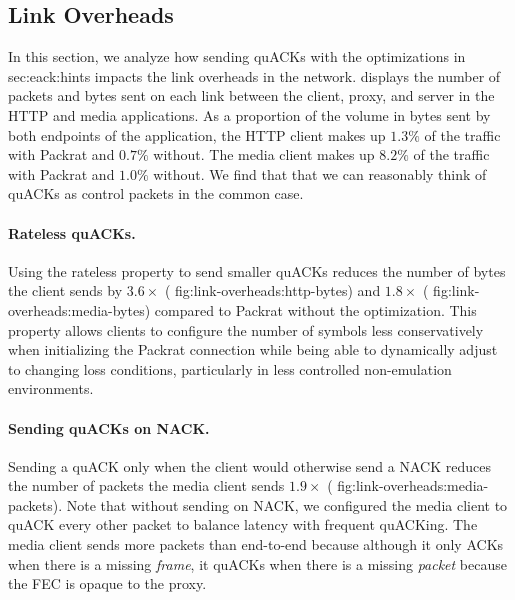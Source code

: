 \subsection{Link Overheads}


In this section, we analyze how sending quACKs with the optimizations in \Cref
{sec:eack:hints} impacts the link overheads in the network.
 displays the number of packets and bytes sent on each
link between the client, proxy, and server in the HTTP and media applications.
As a proportion of the volume in bytes sent by both endpoints of the
application, the HTTP client makes up $1.3\%$ of the traffic with Packrat and
$0.7\%$ without. The media client makes up $8.2\%$ of the traffic with Packrat
and $1.0\%$ without. We find that that we can reasonably think of quACKs as
control packets in the common case.

\paragraph{Rateless quACKs.}
Using the rateless property to send smaller quACKs
reduces the number of bytes the client sends by $3.6\!\times$ (\Cref
{fig:link-overheads:http-bytes}) and $1.8\!\times$ (\Cref
{fig:link-overheads:media-bytes}) compared to Packrat without the optimization.
This property allows clients to configure the number of symbols less
conservatively when initializing the Packrat connection while being able to
dynamically adjust to changing loss conditions, particularly in less controlled
non-emulation environments.

\paragraph{Sending quACKs on NACK.}

Sending a quACK only when the client would otherwise send a NACK reduces the
number of packets the media client sends $1.9\!\times$ (\Cref
{fig:link-overheads:media-packets}). Note that without sending on NACK, we
configured the media client to quACK every other packet to balance latency with
frequent quACKing. The media client sends more packets than end-to-end because
although it only ACKs when there is a missing \textit{frame}, it quACKs when
there is a missing \textit{packet} because the FEC is opaque to the proxy.

